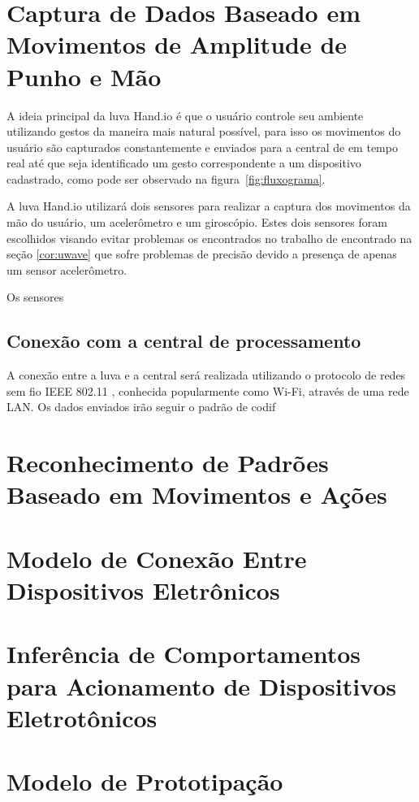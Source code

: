 \section{Captura de Dados Baseado em Movimentos de Amplitude de Punho e Mão}

A ideia principal da luva Hand.io é que o usuário controle seu ambiente utilizando gestos da maneira mais natural possível, para isso os movimentos do usuário são capturados constantemente e enviados para a central de em tempo real até que seja identificado um gesto correspondente a um dispositivo cadastrado, como pode ser observado na figura~\ref{fig:fluxograma}.

A luva Hand.io utilizará dois sensores para realizar a captura dos movimentos da mão do usuário, um acelerômetro e um giroscópio. Estes dois sensores foram escolhidos visando evitar problemas os encontrados no trabalho de \cite{uwave:2009} encontrado na seção \ref{cor:uwave} que sofre problemas de precisão devido a presença de apenas um sensor acelerômetro.

Os sensores 



\subsection{Conexão com a central de processamento}

A conexão entre a luva e a central será realizada utilizando o protocolo de redes sem fio IEEE 802.11  \cite{802.11:1997}, conhecida popularmente como Wi-Fi, através de uma rede LAN. Os dados enviados irão seguir o padrão de codif

\section{Reconhecimento de Padrões Baseado em Movimentos e Ações}



\section{Modelo de Conexão Entre Dispositivos Eletrônicos}

\section{Inferência de Comportamentos para Acionamento de Dispositivos Eletrotônicos}

\section{Modelo de Prototipação}

